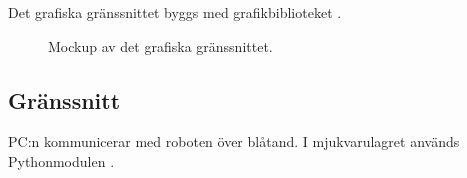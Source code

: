 \documentclass[a4paper,11pt]{article}
\begin{document}
Det grafiska gränssnittet byggs med grafikbiblioteket \cite{tkinter}.

\begin{figure}[h!]
    \caption{Mockup av det grafiska gränssnittet.}
    \label{fig:gui_mockup}
\end{figure}

\subsection{Gränssnitt} \label{ssec:PCInterface}

PC:n kommunicerar med roboten över blåtand. I mjukvarulagret används Pythonmodulen \cite{pybluez}.
\end{document}
